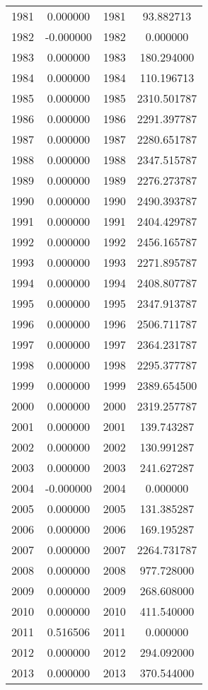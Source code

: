 \documentclass[12pt]{article}
\begin{document}
\begin{longtable}{@{}cccc@{}}
1981 & 0.000000 & 1981 & 93.882713 \\
1982 & -0.000000 & 1982 & 0.000000 \\
1983 & 0.000000 & 1983 & 180.294000 \\
1984 & 0.000000 & 1984 & 110.196713 \\
1985 & 0.000000 & 1985 & 2310.501787 \\
1986 & 0.000000 & 1986 & 2291.397787 \\
1987 & 0.000000 & 1987 & 2280.651787 \\
1988 & 0.000000 & 1988 & 2347.515787 \\
1989 & 0.000000 & 1989 & 2276.273787 \\
1990 & 0.000000 & 1990 & 2490.393787 \\
1991 & 0.000000 & 1991 & 2404.429787 \\
1992 & 0.000000 & 1992 & 2456.165787 \\
1993 & 0.000000 & 1993 & 2271.895787 \\
1994 & 0.000000 & 1994 & 2408.807787 \\
1995 & 0.000000 & 1995 & 2347.913787 \\
1996 & 0.000000 & 1996 & 2506.711787 \\
1997 & 0.000000 & 1997 & 2364.231787 \\
1998 & 0.000000 & 1998 & 2295.377787 \\
1999 & 0.000000 & 1999 & 2389.654500 \\
2000 & 0.000000 & 2000 & 2319.257787 \\
2001 & 0.000000 & 2001 & 139.743287 \\
2002 & 0.000000 & 2002 & 130.991287 \\
2003 & 0.000000 & 2003 & 241.627287 \\
2004 & -0.000000 & 2004 & 0.000000 \\
2005 & 0.000000 & 2005 & 131.385287 \\
2006 & 0.000000 & 2006 & 169.195287 \\
2007 & 0.000000 & 2007 & 2264.731787 \\
2008 & 0.000000 & 2008 & 977.728000 \\
2009 & 0.000000 & 2009 & 268.608000 \\
2010 & 0.000000 & 2010 & 411.540000 \\
2011 & 0.516506 & 2011 & 0.000000 \\
2012 & 0.000000 & 2012 & 294.092000 \\
2013 & 0.000000 & 2013 & 370.544000 \\

\end{longtable}
\end{document}

